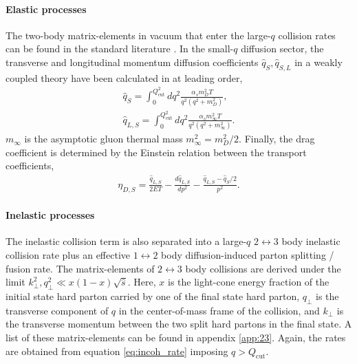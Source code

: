 \documentclass[aps, prc, reprint, amsmath, groupedaddress, nofootinbib]{revtex4-1}
\begin{document}
\paragraph{Elastic processes} The two-body matrix-elements in vacuum that enter the large-$q$ collision rates can be found in the standard literature \cite{RevModPhys.59.465}.
In the small-$q$ diffusion sector, the transverse and longitudinal momentum diffusion coefficients $\hat{q}_S, \hat{q}_{S,L}$ in a weakly coupled theory have been calculated in \cite{Ghiglieri:2015ala} at leading order,
\begin{eqnarray}
\hat{q}_S = \int_0^{Q_{\textrm{cut}}^2} dq^2 \frac{\alpha_s m_D^2 T}{q^2 (q^2+m_D^2)},
\label{eq:qS} \\
\hat{q}_{L,S} = \int_0^{Q_{\textrm{cut}}^2} dq^2 \frac{\alpha_s m_\infty^2 T}{q^2 (q^2+m_\infty^2)}.
\label{eq:qSL}
\end{eqnarray}
$m_{\infty}$ is the asymptotic gluon thermal mass $m_{\infty}^2 = m_D^2/2$.
Finally, the drag coefficient is determined by the Einstein relation between the transport coefficients,
\begin{eqnarray}
\eta_{D,S} = \frac{\hat{q}_{L,S}}{2ET} - \frac{d\hat{q}_{L,S}}{dp^2} - \frac{\hat{q}_{L,S} - \hat{q}_S/2}{p^2}.
\end{eqnarray}

\paragraph{Inelastic processes} The inelastic collision term is also separated into a large-$q$ $2\leftrightarrow 3$ body inelastic collision rate plus an effective $1\leftrightarrow 2$ body diffusion-induced parton splitting / fusion rate.
The matrix-elements of $2\leftrightarrow 3$ body collisions are derived under the limit $k_\perp^2, q_\perp^2 \ll x(1-x)\sqrt{\hat{s}}$.
Here, $x$ is the light-cone energy fraction of the initial state hard parton carried by one of the final state hard parton, $q_\perp$ is the transverse component of $q$ in the center-of-mass frame of the collision, and $k_\perp$ is the transverse momentum between the two split hard partons in the final state. 
A list of these matrix-elements can be found in appendix \ref{app:23}.
Again, the rates are obtained from equation \ref{eq:incoh_rate} imposing $q>Q_{\textrm{cut}}$.
\end{document}
